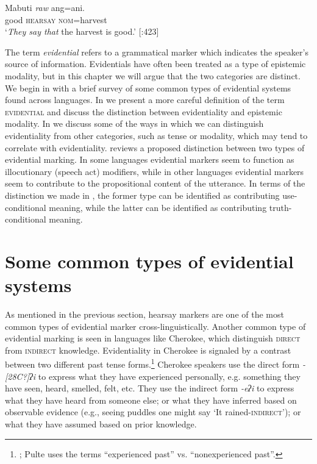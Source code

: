 \ea
\gll Mabuti  \textit{raw}  ang=ani.\\
good  \textsc{hearsay}  \textsc{nom}=harvest\\
\glt ‘\textit{They say that} the harvest is good.’   [\citealt{SchachterOtanes1972}:423]
\z


The term \textit{evidential} refers to a grammatical marker which indicates the speaker’s source of information. Evidentials have often been treated as a type of epistemic modality, but in this chapter we will argue that the two categories are distinct. We begin in  with a brief survey of some common types of evidential systems found across languages. In  we present a more careful definition of the term \textsc{evidential} and discuss the distinction between evidentiality and epistemic modality. In  we discuss some of the ways in which we can distinguish evidentiality from other categories, such as tense or modality, which may tend to correlate with evidentiality.  reviews a proposed distinction between two types of evidential marking. In some languages evidential markers seem to function as illocutionary (speech act) modifiers, while in other languages evidential markers seem to contribute to the propositional content of the utterance. In terms of the distinction we made in , the former type can be identified as contributing use-conditional meaning, while the latter can be identified as contributing truth-conditional meaning.


\section{Some common types of evidential systems}\label{sec:}  %

As mentioned in the previous section, hearsay markers are one of the most common types of evidential marker cross-linguistically. Another common type of evidential marking is seen in languages like Cherokee, which distinguish \textsc{direct} from \textsc{indirect} knowledge. Evidentiality in Cherokee is signaled by a contrast between two different past tense forms.\footnote{\citet{Pulte1985}; Pulte uses the terms “experienced past” vs. “nonexperienced past”.} Cherokee speakers use the direct form \textit{-[28C?]ʔi} to express what they have experienced personally, e.g. something they have seen, heard, smelled, felt, etc. They use the indirect form \textit{-eʔi} to express what they have heard from someone else; or what they have inferred based on observable evidence (e.g., seeing puddles one might say ‘It rained-\textsc{indirect}’); or what they have assumed based on prior knowledge.



